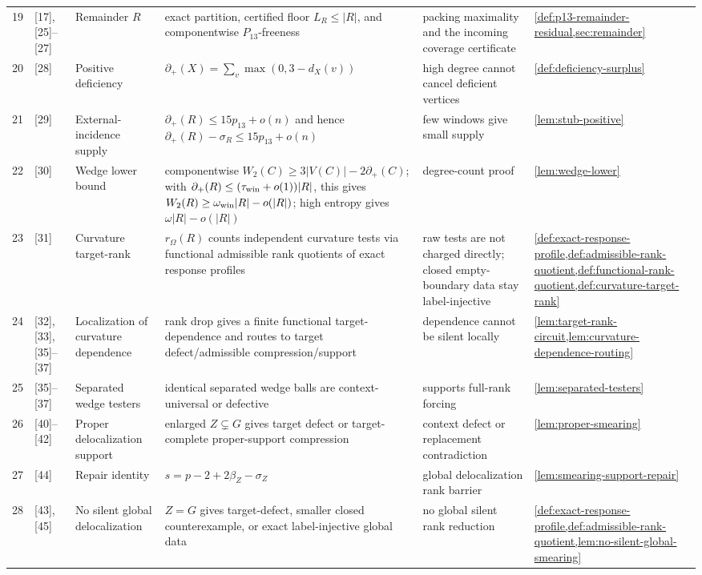 \documentclass[11pt]{article}
\newcommand{\defp}{\partial_+}
\begin{document}
{\begin{longtable}{C{0.04\textwidth} L{0.13\textwidth} L{0.17\textwidth} L{0.25\textwidth} L{0.21\textwidth} L{0.12\textwidth}}
19 & [17], [25]--[27] & Remainder $R$ & exact partition, certified floor $L_R\le|R|$, and componentwise $P_{13}$-freeness & packing maximality and the incoming coverage certificate & \cref{def:p13-remainder-residual,sec:remainder} \\
20 & [28] & Positive deficiency & $\defp(X)=\sum_v\max(0,3-d_X(v))$ & high degree cannot cancel deficient vertices & \cref{def:deficiency-surplus} \\
21 & [29] & External-incidence supply & $\defp(R)\le15p_{13}+o(n)$ and hence $\defp(R)-\sigma_R\le15p_{13}+o(n)$ & few windows give small supply & \cref{lem:stub-positive} \\
22 & [30] & Wedge lower bound & componentwise \(W_2(C)\ge3|V(C)|-2\defp(C)\); with \(\defp(R)\le(\tau_{\rm win}+o(1))|R|\), this gives \(W_2(R)\ge\omega_{\rm win}|R|-o(|R|)\); high entropy gives \(\omega|R|-o(|R|)\) & degree-count proof & \cref{lem:wedge-lower} \\
23 & [31] & Curvature target-rank & $r_\Omega(R)$ counts independent curvature tests via functional admissible rank quotients of exact response profiles & raw tests are not charged directly; closed empty-boundary data stay label-injective & \cref{def:exact-response-profile,def:admissible-rank-quotient,def:functional-rank-quotient,def:curvature-target-rank} \\
24 & [32], [33], [35]--[37] & Localization of curvature dependence & rank drop gives a finite functional target-dependence and routes to target defect/admissible compression/support & dependence cannot be silent locally & \cref{lem:target-rank-circuit,lem:curvature-dependence-routing} \\
25 & [35]--[37] & Separated wedge testers & identical separated wedge balls are context-universal or defective & supports full-rank forcing & \cref{lem:separated-testers} \\
26 & [40]--[42] & Proper delocalization support & enlarged $Z\subsetneq G$ gives target defect or target-complete proper-support compression & context defect or replacement contradiction & \cref{lem:proper-smearing} \\
27 & [44] & Repair identity & $s=p-2+2\beta_Z-\sigma_Z$ & global delocalization rank barrier & \cref{lem:smearing-support-repair} \\
28 & [43], [45] & No silent global delocalization & $Z=G$ gives target-defect, smaller closed counterexample, or exact label-injective global data & no global silent rank reduction & \cref{def:exact-response-profile,def:admissible-rank-quotient,lem:no-silent-global-smearing} \\

\end{longtable}}
\end{document}
